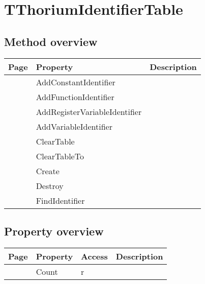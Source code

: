 \section{TThoriumIdentifierTable}
\label{thoriumcore:thorium:tthoriumidentifiertable}
\subsection{Method overview}
\label{thoriumcore:thorium:tthoriumidentifiertable:methods}
\begin{tabularx}{\textwidth}{llX}
Page & Property & Description  \\ \hline
\pageref{thoriumcore:thorium:tthoriumidentifiertable:addconstantidentifier} & AddConstantIdentifier  &  \\
\pageref{thoriumcore:thorium:tthoriumidentifiertable:addfunctionidentifier} & AddFunctionIdentifier  &  \\
\pageref{thoriumcore:thorium:tthoriumidentifiertable:addregistervariableidentifier} & AddRegisterVariableIdentifier  &  \\
\pageref{thoriumcore:thorium:tthoriumidentifiertable:addvariableidentifier} & AddVariableIdentifier  &  \\
\pageref{thoriumcore:thorium:tthoriumidentifiertable:cleartable} & ClearTable  &  \\
\pageref{thoriumcore:thorium:tthoriumidentifiertable:cleartableto} & ClearTableTo  &  \\
\pageref{thoriumcore:thorium:tthoriumidentifiertable:create} & Create  &  \\
\pageref{thoriumcore:thorium:tthoriumidentifiertable:destroy} & Destroy  &  \\
\pageref{thoriumcore:thorium:tthoriumidentifiertable:findidentifier} & FindIdentifier  &  \\
\hline
\end{tabularx}
\subsection{Property overview}
\label{thoriumcore:thorium:tthoriumidentifiertable:properties}
\begin{tabularx}{\textwidth}{lllX}
Page & Property & Access & Description \\ \hline
\pageref{thoriumcore:thorium:tthoriumidentifiertable:count} & Count & r &  \\
\hline
\end{tabularx}
